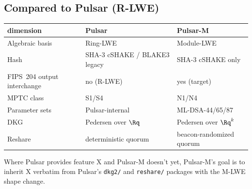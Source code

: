 \subsection{Compared to Pulsar (R-LWE)}

\begin{center}
\begin{tabular}{lll}
\toprule
dimension & Pulsar & Pulsar-M \\
\midrule
Algebraic basis & Ring-LWE & Module-LWE \\
Hash & SHA-3 cSHAKE / BLAKE3 legacy & SHA-3 cSHAKE only \\
FIPS~204 output interchange & no (R-LWE) & yes (target) \\
MPTC class & S1/S4 & N1/N4 \\
Parameter sets & Pulsar-internal & ML-DSA-44/65/87 \\
DKG & Pedersen over $\Rq$ & Pedersen over $\Rq^k$ \\
Reshare & deterministic quorum & beacon-randomized quorum \\
\bottomrule
\end{tabular}
\end{center}

Where Pulsar provides feature X and Pulsar-M doesn't yet, Pulsar-M's
goal is to inherit X verbatim from Pulsar's \texttt{dkg2/} and
\texttt{reshare/} packages with the M-LWE shape change.
